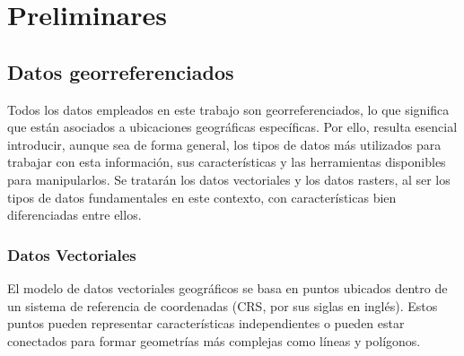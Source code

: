 \documentclass[12pt,a4paper,]{book}
\title{}
\author{Nombre Completo Autor}
\date{18/11/2021}
\def\ifdoblecara{} %
\def\ifprincipal{} %
\let\ifprincipal\undefined %
\numberwithin{dummy}{section}
\theoremstyle{ocrenumbox}
\theoremstyle{blacknumex}
\theoremstyle{blacknumbox}
\theoremstyle{ocrenum}
\theoremstyle{ocrenum}
\begin{document}




\raggedbottom

\ifdefined\ifprincipal
\else
\setlength{\parindent}{1em}
\pagestyle{fancy}
\setcounter{tocdepth}{4}
\tableofcontents

\fi

\ifdefined\ifdoblecara
\fancyhead{}{}
\fancyhead[LE,RO]{\scriptsize\rightmark}
\fancyfoot[LO,RE]{\scriptsize\slshape \leftmark}
\fancyfoot[C]{}
\fancyfoot[LE,RO]{\footnotesize\thepage}
\else
\fancyhead{}{}
\fancyhead[RO]{\scriptsize\rightmark}
\fancyfoot[LO]{\scriptsize\slshape \leftmark}
\fancyfoot[C]{}
\fancyfoot[RO]{\footnotesize\thepage}
\fi

\renewcommand{\headrulewidth}{0.4pt}
\renewcommand{\footrulewidth}{0.4pt}

\hypertarget{preliminares}{%
\chapter{Preliminares}\label{preliminares}}

\hypertarget{datos-georreferenciados}{%
\section{Datos georreferenciados}\label{datos-georreferenciados}}

Todos los datos empleados en este trabajo son georreferenciados, lo que
significa que están asociados a ubicaciones geográficas específicas. Por
ello, resulta esencial introducir, aunque sea de forma general, los
tipos de datos más utilizados para trabajar con esta información, sus
características y las herramientas disponibles para manipularlos. Se
tratarán los datos vectoriales y los datos rasters, al ser los tipos de
datos fundamentales en este contexto, con características bien
diferenciadas entre ellos.

\hypertarget{datos-vectoriales}{%
\subsection{Datos Vectoriales}\label{datos-vectoriales}}

El modelo de datos vectoriales geográficos se basa en puntos ubicados
dentro de un sistema de referencia de coordenadas (CRS, por sus siglas
en inglés). Estos puntos pueden representar características
independientes o pueden estar conectados para formar geometrías más
complejas como líneas y polígonos.
\end{document}
